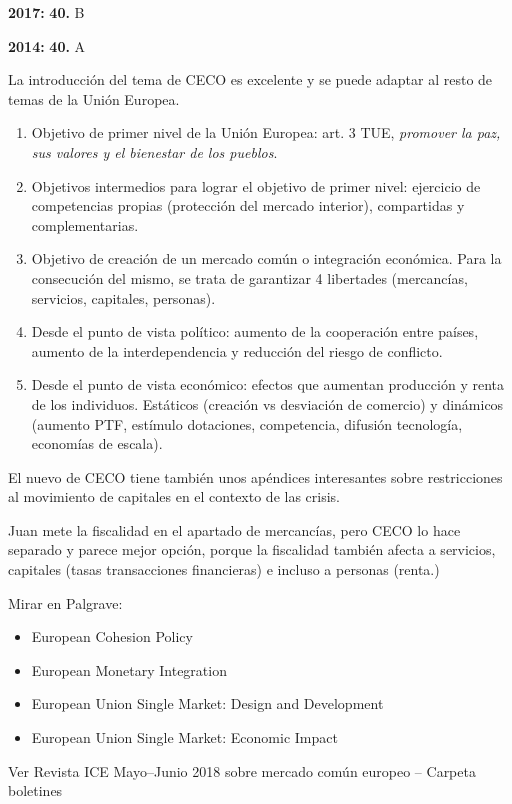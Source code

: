 \documentclass{nuevotema}
\begin{document}
\textbf{2017:} \textbf{40.} B

\textbf{2014:} \textbf{40.} A

La introducción del tema de CECO es excelente y se puede adaptar al resto de temas de la Unión Europea.

\begin{enumerate}
	\item Objetivo de primer nivel de la Unión Europea: art. 3 TUE, \textit{promover la paz, sus valores y el bienestar de los pueblos}.
	\item Objetivos intermedios para lograr el objetivo de primer nivel: ejercicio de competencias propias (protección del mercado interior), compartidas y complementarias.
	\item Objetivo de creación de un mercado común o integración económica. Para la consecución del mismo, se trata de garantizar 4 libertades (mercancías, servicios, capitales, personas).
	\item Desde el punto de vista político: aumento de la cooperación entre países, aumento de la interdependencia y reducción del riesgo de conflicto.
	\item Desde el punto de vista económico: efectos que aumentan producción y renta de los individuos. Estáticos (creación vs desviación de comercio) y dinámicos (aumento PTF, estímulo dotaciones, competencia, difusión tecnología, economías de escala).
\end{enumerate}


El nuevo de CECO tiene también unos apéndices interesantes sobre restricciones al movimiento de capitales en el contexto de las crisis.

Juan mete la fiscalidad en el apartado de mercancías, pero CECO lo hace separado y parece mejor opción, porque la fiscalidad también afecta a servicios, capitales (tasas transacciones financieras) e incluso a personas (renta.)

\bibliografia

Mirar en Palgrave:
\begin{itemize}
	\item European Cohesion Policy
	\item European Monetary Integration
	\item European Union Single Market: Design and Development
	\item European Union Single Market: Economic Impact
\end{itemize}

Ver Revista ICE Mayo--Junio 2018 sobre mercado común europeo -- Carpeta boletines
\end{document}
